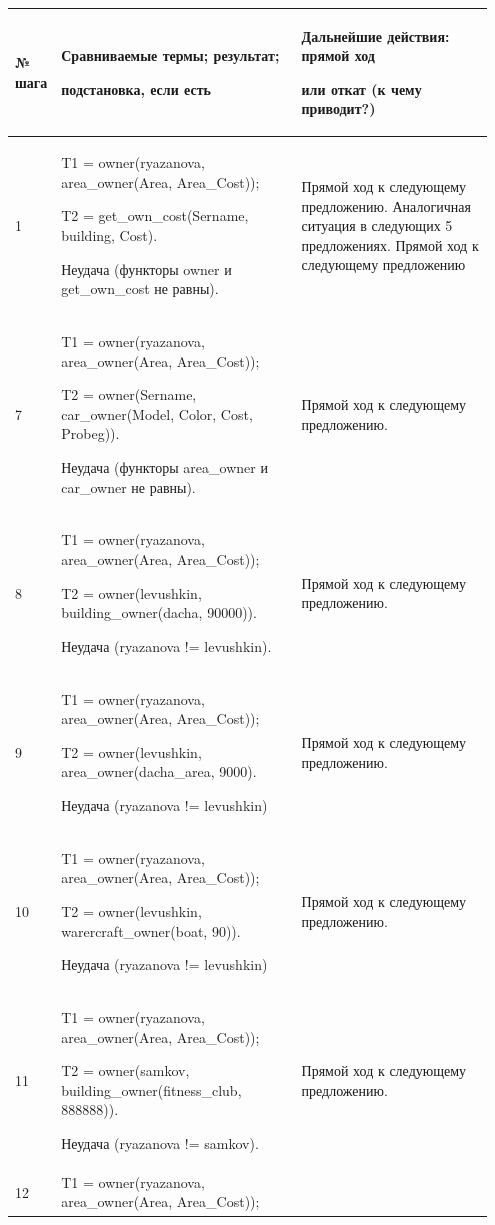 \documentclass[a4paper,12pt]{article}
\begin{document}
	\begin{center}
		\begin{longtable}[h!]{|p{0.05\linewidth}|p{0.5\linewidth}|p{ 0.4\linewidth}|}
			\hline
			{\bf  № шага} & {\bf Сравниваемые термы; результат; 
				
				подстановка, если есть} & {\bf Дальнейшие действия: прямой ход 
				
				или откат (к чему приводит?)} \\
			\hline
			{1} & {T1 = owner(ryazanova, area\_owner(Area, Area\_Cost));
			
		T2 = get\_own\_cost(Sername, building, Cost).
	
Неудача (функторы owner и get\_own\_cost не равны).} & {Прямой ход к следующему предложению. Аналогичная ситуация в следующих 5 предложениях. Прямой ход к следующему предложению}\\
			\hline
			{7} & {T1 = owner(ryazanova, area\_owner(Area, Area\_Cost));
			
		T2 = owner(Sername, car\_owner(Model, Color, Cost, Probeg)).
	
Неудача (функторы area\_owner и car\_owner не равны).} & {Прямой ход к следующему предложению.}\\
			\hline
			{8} & {T1 = owner(ryazanova, area\_owner(Area, Area\_Cost));
			
		T2 = owner(levushkin, building\_owner(dacha, 90000)).
	
Неудача (ryazanova != levushkin).} & {Прямой ход к следующему предложению.}\\
			\hline
			{9} & {T1 = owner(ryazanova, area\_owner(Area, Area\_Cost));
			
		 T2 =  owner(levushkin, area\_owner(dacha\_area, 9000).
	 
 Неудача (ryazanova != levushkin)} & {Прямой ход к следующему предложению.}\\
			\hline
			{10} & {T1 = owner(ryazanova, area\_owner(Area, Area\_Cost));
				
				T2 =  owner(levushkin, warercraft\_owner(boat, 90)).
			
		Неудача (ryazanova != levushkin)} & {Прямой ход к следующему предложению.}\\
			\hline
			{11} & {T1 = owner(ryazanova, area\_owner(Area, Area\_Cost));
				
				T2 =  owner(samkov, building\_owner(fitness\_club, 888888)).
			
		Неудача (ryazanova != samkov).} & {Прямой ход к следующему предложению.}\\
			\hline
			{12} & {T1 = owner(ryazanova, area\_owner(Area, Area\_Cost));
				
}
\end{longtable}
\end{center}
\end{document}
